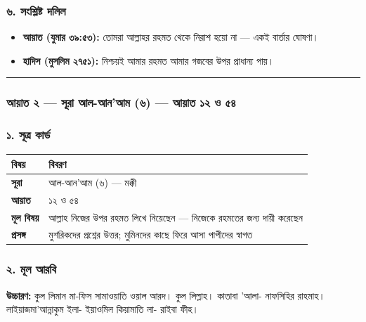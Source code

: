 \subsubsection*{৬. সংশ্লিষ্ট দলিল}

\begin{itemize}
\item \textbf{আয়াত (যুমার ৩৯:৫৩):} তোমরা আল্লাহর রহমত থেকে নিরাশ হয়ো না — একই বার্তার ঘোষণা।
\item \textbf{হাদিস (মুসলিম ২৭৫১):} নিশ্চয়ই আমার রহমত আমার গজবের উপর প্রাধান্য পায়।
\end{itemize}
\medskip\hrule\medskip

\subsubsection*{আয়াত ২ — সূরা আল-আন'আম (৬) — আয়াত ১২ ও ৫৪}

\subsubsection*{১. সূত্র কার্ড}

\begin{table}[h]\centering\small
\begin{tabular}{ll}
বিষয় & বিবরণ \\
\hline
\textbf{সূরা} & আল-আন'আম (৬) — মক্কী \\
\textbf{আয়াত} & ১২ ও ৫৪ \\
\textbf{মূল বিষয়} & আল্লাহ নিজের উপর রহমত লিখে নিয়েছেন — নিজেকে রহমতের জন্য দায়ী করেছেন \\
\textbf{প্রসঙ্গ} & মুশরিকদের প্রশ্নের উত্তর; মুমিনদের কাছে ফিরে আসা পাপীদের স্বাগত \\
\hline
\end{tabular}
\end{table}

\subsubsection*{২. মূল আরবি}

\begin{center}\end{center}
\textbf{উচ্চারণ:} কুল লিমান মা-ফিস সামাওয়াতি ওয়াল আরদ। কুল লিল্লাহ। কাতাবা 'আলা- নাফসিহির রাহমাহ। লাইয়াজমা'আন্নাকুম ইলা- ইয়াওমিল কিয়ামাতি লা- রাইবা ফীহ।


